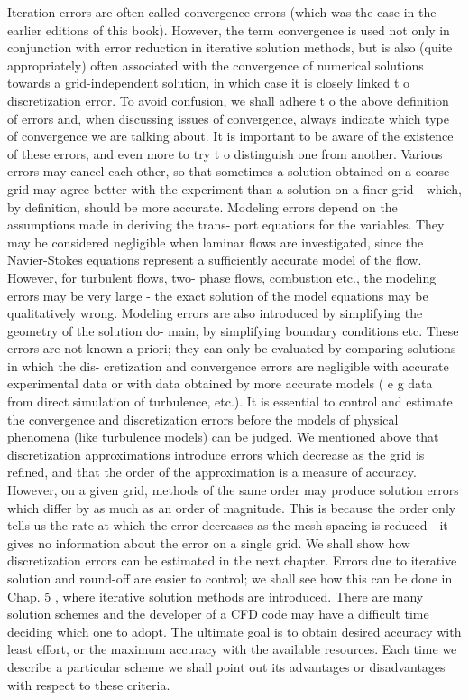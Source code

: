 \begin{itemize}
Iteration errors are often called convergence errors (which was the case in
the earlier editions of this book). However, the term convergence is used
not only in conjunction with error reduction in iterative solution methods,
but is also (quite appropriately) often associated with the convergence of
numerical solutions towards a grid-independent solution, in which case it is
closely linked t o discretization error. To avoid confusion, we shall adhere t o
the above definition of errors and, when discussing issues of convergence,
always indicate which type of convergence we are talking about.
It is important to be aware of the existence of these errors, and even more
to try t o distinguish one from another. Various errors may cancel each other,
so that sometimes a solution obtained on a coarse grid may agree better with
the experiment than a solution on a finer grid - which, by definition, should
be more accurate.
Modeling errors depend on the assumptions made in deriving the trans-
port equations for the variables. They may be considered negligible when
laminar flows are investigated, since the Navier-Stokes equations represent
a sufficiently accurate model of the flow. However, for turbulent flows, two-
phase flows, combustion etc., the modeling errors may be very large - the
exact solution of the model equations may be qualitatively wrong. Modeling
errors are also introduced by simplifying the geometry of the solution do-
main, by simplifying boundary conditions etc. These errors are not known a
priori; they can only be evaluated by comparing solutions in which the dis-
cretization and convergence errors are negligible with accurate experimental
data or with data obtained by more accurate models ( e g data from direct simulation of turbulence, etc.). 
It is essential to control and estimate the convergence and discretization errors before the models of physical phenomena
(like turbulence models) can be judged.
We mentioned above that discretization approximations introduce errors
which decrease as the grid is refined, and that the order of the approximation
is a measure of accuracy. However, on a given grid, methods of the same order
may produce solution errors which differ by as much as an order of magnitude.
This is because the order only tells us the rate at which the error decreases
as the mesh spacing is reduced - it gives no information about the error on a
single grid. We shall show how discretization errors can be estimated in the
next chapter.
Errors due to iterative solution and round-off are easier to control; we
shall see how this can be done in Chap. 5 , where iterative solution methods
are introduced.
There are many solution schemes and the developer of a CFD code may
have a difficult time deciding which one to adopt. The ultimate goal is to
obtain desired accuracy with least effort, or the maximum accuracy with the
available resources. Each time we describe a particular scheme we shall point
out its advantages or disadvantages with respect to these criteria.

\end{itemize}


